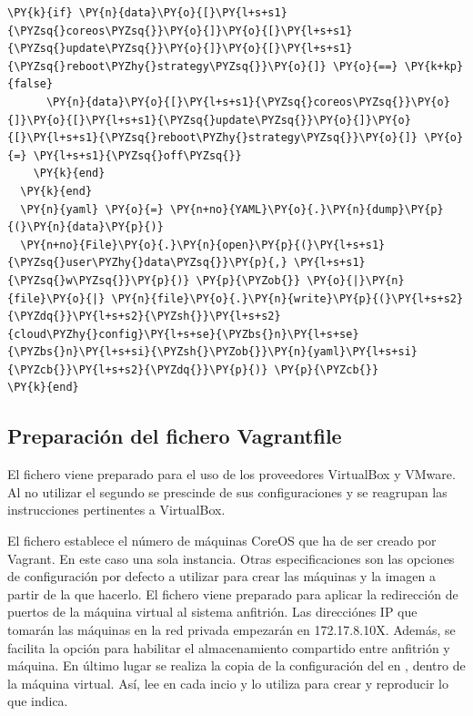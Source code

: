 \begin{codelisting}
\begin{Verbatim}[fontsize=\relsize{-2.5},fontseries=b,commandchars=\\\{\}]
    \PY{k}{if} \PY{n}{data}\PY{o}{[}\PY{l+s+s1}{\PYZsq{}coreos\PYZsq{}}\PY{o}{]}\PY{o}{[}\PY{l+s+s1}{\PYZsq{}update\PYZsq{}}\PY{o}{]}\PY{o}{[}\PY{l+s+s1}{\PYZsq{}reboot\PYZhy{}strategy\PYZsq{}}\PY{o}{]} \PY{o}{==} \PY{k+kp}{false}
      \PY{n}{data}\PY{o}{[}\PY{l+s+s1}{\PYZsq{}coreos\PYZsq{}}\PY{o}{]}\PY{o}{[}\PY{l+s+s1}{\PYZsq{}update\PYZsq{}}\PY{o}{]}\PY{o}{[}\PY{l+s+s1}{\PYZsq{}reboot\PYZhy{}strategy\PYZsq{}}\PY{o}{]} \PY{o}{=} \PY{l+s+s1}{\PYZsq{}off\PYZsq{}}
    \PY{k}{end}
  \PY{k}{end}
  \PY{n}{yaml} \PY{o}{=} \PY{n+no}{YAML}\PY{o}{.}\PY{n}{dump}\PY{p}{(}\PY{n}{data}\PY{p}{)}
  \PY{n+no}{File}\PY{o}{.}\PY{n}{open}\PY{p}{(}\PY{l+s+s1}{\PYZsq{}user\PYZhy{}data\PYZsq{}}\PY{p}{,} \PY{l+s+s1}{\PYZsq{}w\PYZsq{}}\PY{p}{)} \PY{p}{\PYZob{}} \PY{o}{|}\PY{n}{file}\PY{o}{|} \PY{n}{file}\PY{o}{.}\PY{n}{write}\PY{p}{(}\PY{l+s+s2}{\PYZdq{}}\PY{l+s+s2}{\PYZsh{}}\PY{l+s+s2}{cloud\PYZhy{}config}\PY{l+s+se}{\PYZbs{}n}\PY{l+s+se}{\PYZbs{}n}\PY{l+s+si}{\PYZsh{}\PYZob{}}\PY{n}{yaml}\PY{l+s+si}{\PYZcb{}}\PY{l+s+s2}{\PYZdq{}}\PY{p}{)} \PY{p}{\PYZcb{}}
\PY{k}{end}
\end{Verbatim}
\end{codelisting}

\subsection{Preparación del fichero Vagrantfile}

El fichero viene preparado para el uso de los proveedores VirtualBox y VMware. Al no utilizar el segundo se prescinde de sus configuraciones y se reagrupan las instrucciones pertinentes a VirtualBox.

El fichero  establece el número de máquinas CoreOS que ha de ser creado por Vagrant. En este caso una sola instancia. Otras especificaciones son las opciones de configuración por defecto a utilizar para crear las máquinas y la imagen a partir de la que hacerlo. El fichero viene preparado para aplicar la redirección de puertos de la máquina virtual al sistema anfitrión. Las direcciónes IP que tomarán las máquinas en la red privada empezarán en 172.17.8.10X. Además, se facilita la opción para habilitar el almacenamiento compartido entre anfitrión y máquina. En último lugar se realiza la copia de la configuración del  en , dentro de la máquina virtual. Así,  lee  en cada incio y lo utiliza para crear y reproducir lo que indica.

